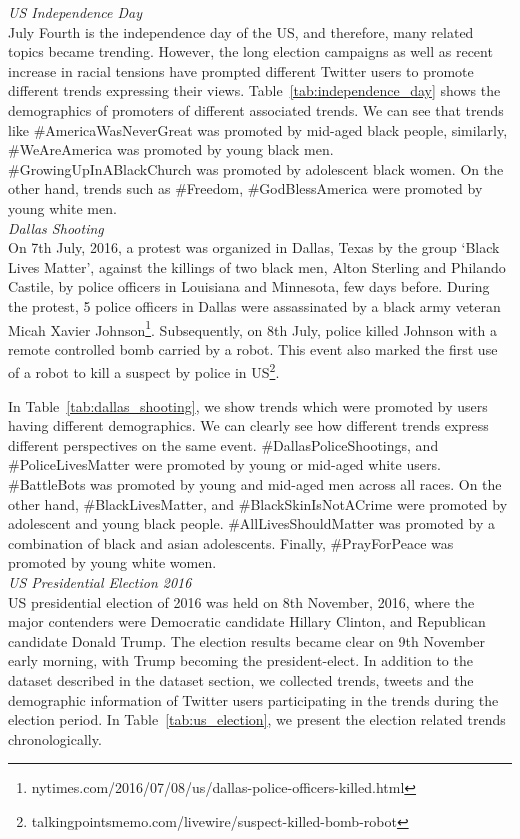 \documentclass[letterpaper]{article}
\begin{document}
\noindent \textit{US Independence Day} \\
July Fourth is the independence day of the US, and therefore, many related topics became trending. However, the long election campaigns as well as recent increase in racial tensions have prompted different Twitter users to promote different trends expressing their views. Table~\ref{tab:independence_day} shows the demographics of promoters of different associated trends. We can see that trends like \#AmericaWasNeverGreat was promoted by mid-aged black people, similarly, \#WeAreAmerica was promoted by young black men.
\#GrowingUpInABlackChurch was promoted by adolescent black women. On the other hand, trends such as \#Freedom, \#GodBlessAmerica were promoted by young white men. \\

\noindent \textit{Dallas Shooting} \\
On 7th July, 2016, a protest was organized in Dallas, Texas by the group `Black Lives Matter', against the killings of two black men, Alton Sterling and Philando Castile, by police officers in Louisiana and Minnesota, few days before. During the protest, 5 police officers in Dallas were assassinated by a black army veteran Micah Xavier Johnson\footnote{nytimes.com/2016/07/08/us/dallas-police-officers-killed.html}. Subsequently, on 8th July, police killed Johnson with a remote controlled bomb carried by a robot. This event also marked the first use of a robot to kill a suspect by police in US\footnote{talkingpointsmemo.com/livewire/suspect-killed-bomb-robot}.

In Table~\ref{tab:dallas_shooting}, we show trends which were promoted by users having different demographics. We can clearly see how different trends express different perspectives on the same event. \#DallasPoliceShootings, and \#PoliceLivesMatter were promoted by young or mid-aged white users. \#BattleBots was promoted by young and mid-aged men across all races. On the other hand, \#BlackLivesMatter, and  \#BlackSkinIsNotACrime were promoted by adolescent and young black people. \#AllLivesShouldMatter was promoted by a combination of black and asian adolescents. Finally, \#PrayForPeace was promoted by young white women.\\

\noindent \textit{US Presidential Election 2016} \\
US presidential election of 2016 was held on 8th November, 2016, where the major contenders were Democratic candidate Hillary Clinton, and Republican candidate Donald Trump. The election results became clear on 9th November early morning, with Trump becoming the president-elect. In addition to the dataset described in the dataset section, we collected trends, tweets and the demographic information of Twitter users participating in the trends during the election period. In Table~\ref{tab:us_election}, we present the election related trends chronologically.
\end{document}
